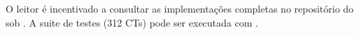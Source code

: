\begin{observacao}
O leitor é incentivado a consultar as implementações completas no
repositório do \opencodeeco{} sob
. A suite de testes
 (312 CTs) pode ser executada com .
\end{observacao}

